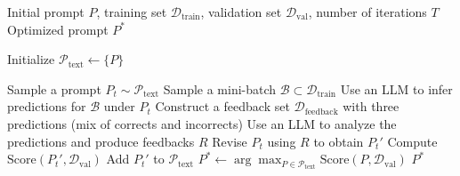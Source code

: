 \documentclass[12pt]{article}
\begin{document}
\begin{algorithm}
\caption{Textual Gradient Update}
\label{alg:textual-gradient}
\begin{algorithmic}[1]
\Require Initial prompt $P$, training set $\mathcal{D}_{\mathrm{train}}$, validation set $\mathcal{D}_{\mathrm{val}}$, number of iterations $T$
\Ensure Optimized prompt $P^{*}$

\State Initialize $\mathcal{P}_{\text{text}} \gets \{P\}$ 

 
    \State Sample a prompt $P_t \sim \mathcal{P}_{\text{text}}$
    \State Sample a mini-batch $\mathcal{B} \subset \mathcal{D}_{\mathrm{train}}$
    \State Use an LLM to infer predictions for $\mathcal{B}$ under $P_t$
    \State Construct a feedback set $\mathcal{D}_{\mathrm{feedback}}$ with three predictions (mix of corrects and incorrects)
    \State Use an LLM to analyze the predictions and produce feedbacks $R$  
    \State Revise $P_t$ using $R$ to obtain $P_t'$
    \State Compute $\mathrm{Score}(P_t', \mathcal{D}_{\mathrm{val}})$
    \State Add $P_t'$ to $\mathcal{P}_{\text{text}}$
\EndFor
\State $P^{*} \gets \arg\max_{P \in \mathcal{P}_{\text{text}}} \mathrm{Score}(P, \mathcal{D}_{\text{val}})$
\State \Return $P^{*}$
\end{algorithmic}
\end{algorithm}
\end{document}
